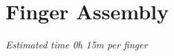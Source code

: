 
\chapter{Finger Assembly}  %

\label{Finger Assembly} 
%
%

\textit{Estimated time 0h 15m per finger}
